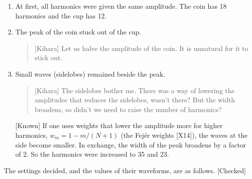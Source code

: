 \documentclass[
  a4paper,
]{article}
\begin{document}
\begin{enumerate}
\def\labelenumi{\arabic{enumi}.}
\item
  At first, all harmonics were given the same amplitude. The coin has 18
  harmonics and the cup has 12.
\item
  The peak of the coin stuck out of the cup.

  \begin{quote}
  {[}Kihara{]} Let us halve the amplitude of the coin. It is unnatural
  for it to stick out.
  \end{quote}
\item
  Small waves (sidelobes) remained beside the peak.

  \begin{quote}
  {[}Kihara{]} The sidelobes bother me. There was a way of lowering the
  amplitudes that reduces the sidelobes, wasn't there? But the width
  broadens, so didn't we need to raise the number of harmonics?
  \end{quote}

  {[}Known{]} If one uses weights that lower the amplitude more for
  higher harmonics, \(w_m = 1 - m/(N+1)\) (the Fejér weights {[}X14{]}),
  the waves at the side become smaller. In exchange, the width of the
  peak broadens by a factor of 2. So the harmonics were increased to 35
  and 23.
\end{enumerate}

The settings decided, and the values of their waveforms, are as follows.
{[}Checked{]}
\end{document}
